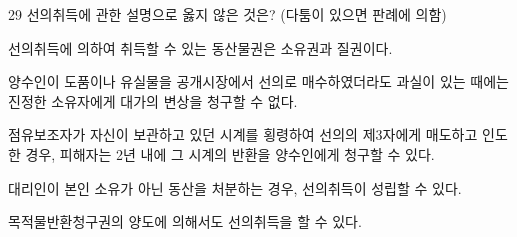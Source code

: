 \begin{question}{29}
선의취득에 관한 설명으로 옳지 않은 것은? (다툼이 있으면 판례에 의함)
\begin{choices}
  \item 선의취득에 의하여 취득할 수 있는 동산물권은 소유권과 질권이다.
  \item 양수인이 도품이나 유실물을 공개시장에서 선의로 매수하였더라도 과실이 있는 때에는 진정한 소유자에게 대가의 변상을 청구할 수 없다.
  \item 점유보조자가 자신이 보관하고 있던 시계를 횡령하여 선의의 제3자에게 매도하고 인도한 경우, 피해자는 2년 내에 그 시계의 반환을 양수인에게 청구할 수 있다.
  \item 대리인이 본인 소유가 아닌 동산을 처분하는 경우, 선의취득이 성립할 수 있다.
  \item 목적물반환청구권의 양도에 의해서도 선의취득을 할 수 있다.
\end{choices}
\end{question}
